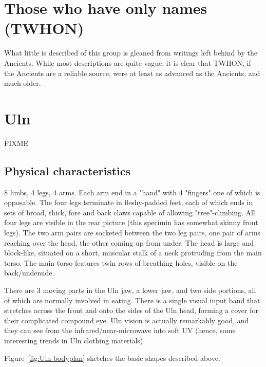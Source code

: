 \section{Those who have only names (TWHON)}

What little is described of this group is gleaned from writings left
behind by the Ancients. While most descriptions are quite vague, it is
clear that TWHON, if the Ancients are a reliable source, were at least
as advanced as the Ancients, and much older.

\section{Uln}

FIXME 

\subsection{Physical characteristics}
 
8 limbs, 4 legs, 4 arms. Each arm end in a "hand" with 4 "fingers" one
of which is opposable. The four legs terminate in fleshy-padded feet,
each of which ends in sets of broad, thick, fore and back claws
capable of allowing "tree"-climbing. All four legs are visible in the
rear picture (this specimin has somewhat skinny front legs). The two
arm pairs are socketed between the two leg pairs, one pair of arms
reaching over the head, the other coming up from under. The head is
large and block-like, situated on a short, muscular stalk of a neck
protruding from the main torso. The main torso features twin rows of
breathing holes, visible on the back/underside.

There are 3 moving parts in the Uln jaw, a lower jaw, and two side
portions, all of which are normally involved in eating. There is a
single visual input band that stretches across the front and onto the
sides of the Uln head, forming a cover for their complicated compound
eye. Uln vision is actually remarkably good, and they can see from the
infrared/near-microwave into soft UV (hence, some interesting trends
in Uln clothing materials).

Figure~\ref{fig:Uln-bodyplan} sketches the basic shapes described above.


